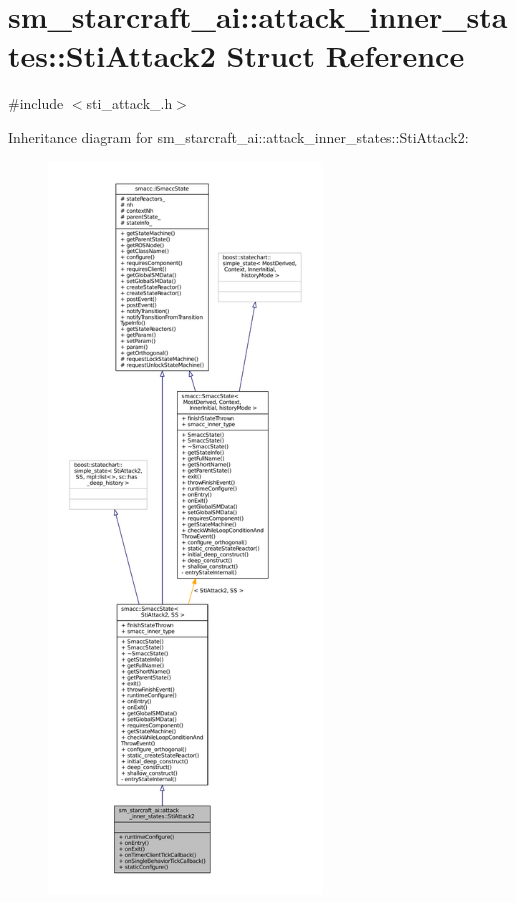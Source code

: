 \hypertarget{structsm__starcraft__ai_1_1attack__inner__states_1_1StiAttack2}{}\section{sm\+\_\+starcraft\+\_\+ai\+:\+:attack\+\_\+inner\+\_\+states\+:\+:Sti\+Attack2 Struct Reference}
\label{structsm__starcraft__ai_1_1attack__inner__states_1_1StiAttack2}


{\ttfamily \#include $<$sti\+\_\+attack\+\_.\+h$>$}



Inheritance diagram for sm\+\_\+starcraft\+\_\+ai\+:\+:attack\+\_\+inner\+\_\+states\+:\+:Sti\+Attack2\+:
\nopagebreak
\begin{figure}[H]
\begin{center}
\leavevmode
\includegraphics[height=550pt]{structsm__starcraft__ai_1_1attack__inner__states_1_1StiAttack2__inherit__graph}
\end{center}
\end{figure}


